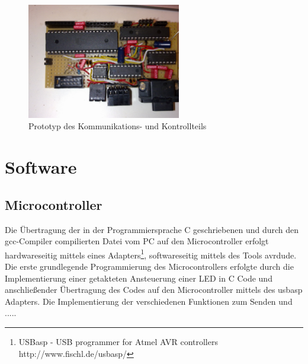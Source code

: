 \documentclass[
	11pt,								%
	a4paper,						%
	oneside,						%
	titlepage,					%
	headsepline,				%
	DIV13,							%
	abstracton,	 				%
	BCOR0cm,						%
	bibliography=totoc, %
]{scrreprt}							%
\begin{document}
\begin{figure}[htb]
\centering
\includegraphics[width=0.6\textwidth]{images/prototyp.jpg}
\caption{Prototyp des Kommunikations- und Kontrollteils}
\label{fig:prototyp}
\end{figure}


\section{Software}

  \subsection{Microcontroller}
    Die Übertragung der in der Programmiersprache C geschriebenen und durch den gcc-Compiler compilierten Datei vom PC auf den Microcontroller erfolgt hardwareseitig mittels eines Adapters\footnote{USBasp - USB programmer for Atmel AVR controllers http://www.fischl.de/usbasp/}, softwareseitig mittels des
  Tools avrdude. Die erste grundlegende Programmierung des Microcontrollers erfolgte durch die Implementierung einer getakteten Ansteuerung einer LED in C Code und anschließender Übertragung
  des Codes auf den Microcontroller mittels des usbasp Adapters. Die Implementierung der verschiedenen Funktionen zum Senden und ....\cite{8}.
\end{document}
